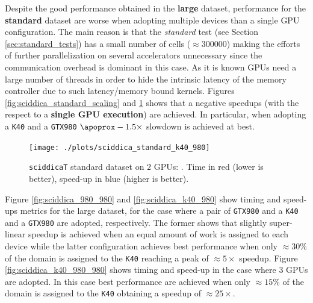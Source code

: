 Despite the good performance obtained in the \textbf{large} dataset, performance for the \textbf{standard} dataset are worse when adopting multiple devices than a single GPU configuration. The main reason is that the \textit{standard} test (see Section \ref{sec:standard_tests}) has a small number of cells ($\approx 300000$) making the efforts of further parallelization on several accelerators unnecessary since the communication overhead is dominant in this case. As it is known GPUs need a large number of threads in order to hide the intrinsic latency of the memory controller due to such latency/memory bound kernels.
Figures \ref{fig:sciddica_standard_scaling} and \ref{fig:sciddica_standard_980_k40} shows  that a negative speedups (with the respect to a \textbf{single GPU execution}) are achieved. In particular, when adopting a \texttt{K40} and a \texttt{GTX980} $\apoprox -1.5 \times$ slowdown is achieved at best.
\begin{figure}[!htb]
	\centering
	\texttt{[image: ./plots/sciddica\_standard\_k40\_980]}
	\caption{\texttt{sciddicaT} standard dataset on $2$ GPUs: . Time in red (lower is better), speed-up in blue (higher is better).}
	\label{fig:sciddica_standard_980_k40}
\end{figure}
Figure \ref{fig:sciddica_980_980} and \ref{fig:sciddica_k40_980} show timing and speed-ups metrics for the large dataset, for the case where a pair of \texttt{GTX980} and a \texttt{K40} and a \texttt{GTX980} are adopted, respectively. The former shows that slightly super-linear speedup is achieved when an equal amount of work is assigned to each device while the latter configuration achieves best performance when only $\approx 30\%$ of the domain is assigned to the \texttt{K40} reaching a peak of $\approx 5 \times$ speedup.
Figure \ref{fig:sciddica_k40_980_980} shows timing and speed-up in the case where $3$ GPUs are adopted. In this case best performance are achieved when only $\approx 15\%$ of the domain is assigned to the \texttt{K40} obtaining a speedup of  $\approx 25 \times$.
